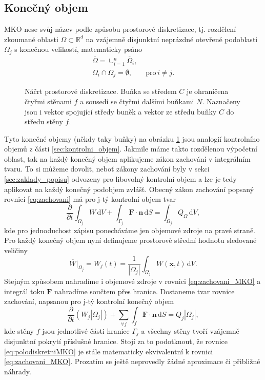 \subsection{Konečný objem}
MKO nese svůj název podle způsobu prostorové diskretizace, tj. rozdělení zkoumané oblasti $\Omega\subset\mathbb{R}^d$ na vzájemně disjunktní neprázdné otevřené podoblasti $\Omega_j$ s konečnou velikostí, matematicky psáno
\begin{align*}
\overline{\Omega} = \cup^n_{i=1}\overline{\Omega}_i,&\\
\Omega_i \cap \Omega_j = \emptyset,& \,\,\mathrm{pro} \, i \neq j.
\end{align*}
\begin{figure}[]
	\centering
	\def\svgwidth{0.9\textwidth}
	\graphicspath{{img/inkscape/}}
	
	\caption[Konečný objem]{Náčrt prostorové diskretizace. Buňka se středem $ C $ je ohraničena čtyřmi stěnami $ f $ a sousedí se čtyřmi dalšími buňkami $ N $. Naznačeny jsou i vektor spojující středy buněk a vektor ze středu buňky $ C $ do středu stěny $ f $.}
	\label{fig:cellsketch}
\end{figure}
Tyto konečné objemy (někdy taky buňky) na obrázku \ref{fig:cellsketch} jsou analogií kontrolního objemů z části \ref{sec:kontrolni_objem}. Jakmile máme takto rozdělenou výpočetní oblast, tak na každý konečný objem aplikujeme zákon zachování v integrálním tvaru. To si můžeme dovolit, neboť zákony zachování byly v sekci \ref{sec:zaklady_popisu} odvozeny pro libovolný kontrolní objem a lze je tedy aplikovat na každý konečný podobjem zvlášť. Obecný zákon zachování popsaný rovnicí \ref{eq:zachovani} má pro j-tý kontrolní objem tvar
\begin{equation}\label{eq:zachovani_MKO}
\frac{\partial}{\partial t} \int_{\Omega_j}W\,\mathrm{d}V + \int_{\Gamma_j} \mathbf{F} \cdot \mathbf{n} \,\mathrm{d}S = \int_{\Omega_j}Q_\Omega \,\mathrm{d}V,
\end{equation}
kde pro jednoduchost zápisu ponecháváme jen objemové zdroje na pravé straně.
Pro každý konečný objem nyní definujeme prostorově střední hodnotu sledované veličiny 
\begin{equation}
\overline{W}|_{\Omega_j}= W_j(t) = \frac{1}{|\Omega_j|}\int_{\Omega_j}W(\mathbf{x},t) \,\mathrm{d} V.
\end{equation}
Stejným způsobem nahradíme i objemové zdroje v rovnici \ref{eq:zachovani_MKO} a integrál toku $\mathbf{F}$ nahradíme součtem přes hranice. Dostaneme tvar rovnice zachování, napsanou pro j-tý kontrolní konečný objem
\begin{equation}\label{eq:polodiskretniMKO}
\frac{\partial}{\partial t} (W_j|\Omega_j|) + \sum_{\forall f} \int_{f}\mathbf{F}\cdot \mathbf{n} \,\mathrm{d}S = Q_j|\Omega_j|,
\end{equation} 
kde stěny $f$ jsou jednotlivé části hranice $\Gamma_j$ a všechny stěny tvoří vzájemně disjunktní pokrytí příslušné hranice.
Stojí za to podotknout, že rovnice \ref{eq:polodiskretniMKO} je stále matematicky ekvivalentní k rovnici \ref{eq:zachovani_MKO}.
Prozatím se ještě neprovedly žádné aproximace či přibližné náhrady.


